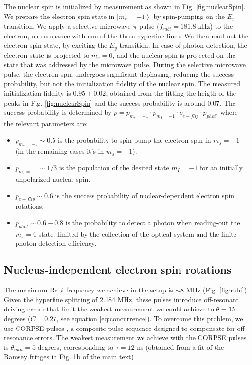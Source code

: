 \documentclass[12pt]{article}
\begin{document}
The nuclear spin is initialized by measurement \cite{pfaff} as shown in Fig. \ref{fig:nuclearSpin}. We prepare the electron spin state in $\left| m_s=\pm 1 \right \rangle$ by spin-pumping on the $E_{y}$ transition. We apply a selective microwave $\pi$-pulse ($f_{rabi} = 181.8$ kHz) to the electron, on resonance with one of the three hyperfine lines. We then read-out the electron spin state, by exciting the $E_y$ transition. In case of photon detection, the electron state is projected to $m_s=0$, and the nuclear spin is projected on the state that was addressed by the microwave pulse.
During the selective microwave pulse, the electron spin undergoes significant dephasing, reducing the success probability, but not the initialization fidelity of the nuclear spin. The measured initialization fidelity is $0.95 \pm 0.02$, obtained from the fitting the heigth of the peaks in Fig. \ref{fig:nuclearSpin}  and the success probability is around $0.07$. The success probability is determined by $p = p_{m_s=-1} \cdot p_{m_I=-1} \cdot p_{e-flip} \cdot p_{phot}$, where the relevant parameters are:
\begin{itemize}
 \item $p_{m_s=-1} \sim 0.5$ is the probability to spin pump the electron spin in $m_s=-1$ (in the remaining cases it's in $m_s = +1$).
 \item $p_{m_I=-1} \sim 1/3$ is the population of the desired state $m_I=-1$ for an initially unpolarized nuclear spin.
 \item $p_{e-flip} \sim 0.6$ is the success probability of nuclear-dependent electron spin rotations.
 \item $ p_{phot} \sim 0.6-0.8$ is the probability to detect a photon when reading-out the $m_s=0$ state, limited by the collection of the optical system and the finite photon detection efficiency.
\end{itemize}


\subsection {Nucleus-independent electron spin rotations}

The maximum Rabi frequency we achieve in the setup is $\sim 8$ MHz (Fig. \ref{fig:rabi}). Given the hyperfine splitting of 2.184 MHz, these pulses introduce off-resonant driving errors that limit the weakest measurement we could achieve to $\theta = 15$ degrees ($C = 0.27$, see equation \ref{eq:concurrence}). To overcome this problem, we use CORPSE pulses \cite{corpse}, a composite pulse sequence designed to compensate for off-resonance errors. The weakest measurement we achieve with the CORPSE pulses is $\theta_{min} = 5$ degrees, corresponding to $\tau = 12$ ns (obtained from a fit of the Ramsey fringes in Fig. 1b of the main text)
\end{document}
